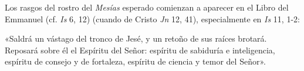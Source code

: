 	 Los rasgos del rostro del \emph{Mesías} esperado comienzan a aparecer en el Libro del Emmanuel (cf. \emph{Is} 6, 12) (cuando  de Cristo \emph{Jn} 12, 41), especialmente en \emph{Is} 11, 1-2:
	
	\begin{cceprose}
		«Saldrá un vástago del tronco de Jesé, 
		y un retoño de sus raíces brotará. 			
		Reposará sobre él el Espíritu del Señor: 			
		espíritu de sabiduría e inteligencia, 			
		espíritu de consejo y de fortaleza, 
		espíritu de ciencia y temor del Señor».
	\end{cceprose}

